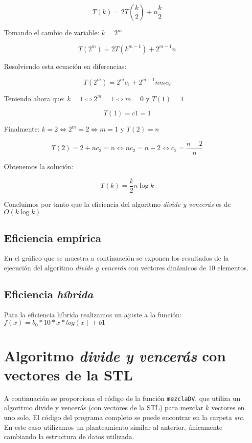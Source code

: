 \documentclass[11pt]{article}
\begin{document}
$$ T(k) = 2T(\frac{k}{2}) + n\frac{k}{2} $$

Tomando el cambio de variable: $ k = 2^m $

$$ T(2^m) = 2T(k^{m-1}) + 2^{m-1}n $$

Resolviendo esta ecuación en diferencias:

$$ T(2^m) = 2^mc_1 + 2^{m-1}nm c_2 $$

Teniendo ahora que: $k = 1 \iff 2^m = 1 \iff m = 0$ y $T(1) = 1$

$$ T(1) = c1 = 1 $$

Finalmente: $k = 2 \iff 2^m = 2 \iff m = 1$ y $T(2) = n$

$$ T(2) = 2 + n c_2 = n \iff n c_2 = n - 2 \iff c_2 = \frac{n-2}{n}$$

Obtenemos la solución:

$$T(k) = \frac{k}{2}n\log k$$

Concluimos por tanto que la eficiencia del algoritmo \textit{divide y vencerás} es de $O(k\log k)$

\subsection*{Eficiencia empírica}

En el gráfico que se muestra a continuación se exponen los resultados de la
ejecución del algoritmo \textit{divide y vencerás} con vectores dinámicos de 10 elementos.

\begin{center}
	
\end{center}

\subsection*{Eficiencia \textit{híbrida}}
Para la eficiencia híbrida realizamos un ajuste a la función: $f(x) = b_0*10*x*log(x) + b1$
\begin{center}
	
\end{center}

\section*{Algoritmo \textit{divide y vencerás} con vectores de la STL}


A continuación se proporciona el código de la función \texttt{mezclaDV},
que utiliza un algoritmo divide y vencerás (con vectores de la STL) para mezclar $k$ vectores en uno solo. El
código del programa completo se puede encontrar en la carpeta \textit{src}.\\
En este caso utilizamos un planteamiento similar al anterior, únicamente cambiando la estructura de datos utilizada.
\end{document}
